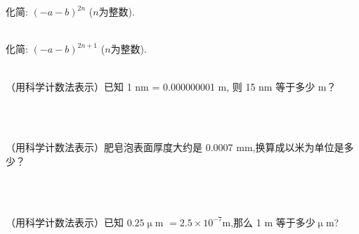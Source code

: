 \\ \\
\item{
    化简: $(-a-b)^{2n}$ ($n$为整数).
}
\\ \\
\item{
    化简: $(-a-b)^{2n+1}$ ($n$为整数).
}
\\ \\
\item{
    （用科学计数法表示）已知 1 nm = 0.000000001 m, 则 15 nm 等于多少 m？
    \iffalse
    \fangsong\zihao{4}
    解答: 

    \textcircled{1} 写出换算关系
    \begin{align*}
        1 \rm{nm} &= 10^{-9} \rm{m}
    \end{align*}
    \textcircled{2} 两边同时乘15
    \begin{align*}
        15 \rm{nm} &= 15 \times 10^{-9} \rm{m}\\
        &= 1.5\times 10^{-8} \rm{m}.
    \end{align*}
    \fi
}
\\ \\
\item{
    （用科学计数法表示）肥皂泡表面厚度大约是 0.0007 mm,换算成以米为单位是多少？
    \iffalse
    \fangsong\zihao{4}
    解答: 

    \textcircled{1} 写出换算关系
    \begin{align*}
        1 \rm{mm} &= 10^{-3} \rm{m}
    \end{align*}
    \textcircled{2} 两边同时乘0.0007
    \begin{align*}
        0.0007 \rm{mm} &= 0.0007 \times 10^{-3} \rm{m}\\
        &= 7\times 10^{-7} \rm{m}.
    \end{align*}
    \fi
}
\\ \\
\item{
    （用科学计数法表示）已知 $0.25 \upmu$m $ = 2.5\times 10^{-7}$m,那么 1 m 等于多少$\upmu$m?
    \iffalse
    \fangsong\zihao{4}
    思路: 将题中给出的换算关系两边同时除以 $2.5\times 10^{-7}$,右边就出现了 1m.

    解答: 
    \begin{align*}
        \frac{0.25}{2.5\times 10^{-7}} \rm{\upmu m} &= 1\rm{m}\\
        10^6 \rm{\upmu m} &= 1\rm{m}\\
        1\rm{m} &= 10^6 \rm{\upmu m}.
    \end{align*}
    \fi
}
